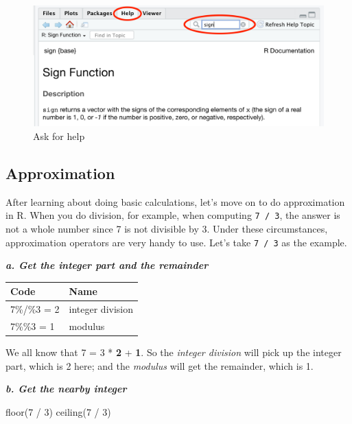 \documentclass[
]{book}
\newenvironment{Shaded}{\begin{snugshade}}{\end{snugshade}}
\newcommand{\DecValTok}[1]{\textcolor[rgb]{0.00,0.00,0.81}{#1}}
\newcommand{\FunctionTok}[1]{\textcolor[rgb]{0.00,0.00,0.00}{#1}}
\newcommand{\NormalTok}[1]{#1}
\newcommand{\SpecialCharTok}[1]{\textcolor[rgb]{0.00,0.00,0.00}{#1}}
\begin{document}
\begin{figure}

{\centering \includegraphics[width=0.7\linewidth]{pics/1help} 

}

\caption{Ask for help}\label{fig:help}
\end{figure}

\hypertarget{approximation}{%
\subsection{Approximation}\label{approximation}}

After learning about doing basic calculations, let's move on to do approximation in R. When you do division, for example, when computing \texttt{7\ /\ 3}, the answer is not a whole number since 7 is not divisible by 3. Under these circumstances, approximation operators are very handy to use. Let's take \texttt{7\ /\ 3} as the example.

\textbf{\emph{a. Get the integer part and the remainder}}

\begin{tabular}{l|l}
\hline
Code & Name\\
\hline
7\%/\%3 = 2 & integer division\\
\hline
7\%\%3 = 1 & modulus\\
\hline
\end{tabular}

We all know that 7 = 3 * \textbf{2} + \textbf{1}. So the \emph{integer division} will pick up the integer part, which is 2 here; and the \emph{modulus} will get the remainder, which is 1.

\textbf{\emph{b. Get the nearby integer}}

\begin{Shaded}
\begin{Highlighting}[]
\FunctionTok{floor}\NormalTok{(}\DecValTok{7} \SpecialCharTok{/} \DecValTok{3}\NormalTok{)   }
\FunctionTok{ceiling}\NormalTok{(}\DecValTok{7} \SpecialCharTok{/} \DecValTok{3}\NormalTok{) }
\end{Highlighting}
\end{Shaded}
\end{document}
